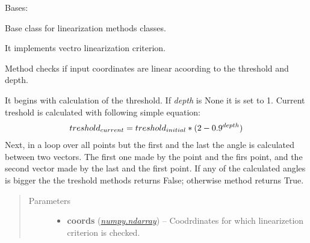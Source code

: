\documentclass[a4paper,10pt,english]{sphinxmanual}
\begin{document}
\begin{fulllineitems}
\label{aqueduct.geom.traces:aqueduct.geom.traces.VectorLinearize}
Bases: \href{http://docs.python.org/2/library/functions.html\#object}{}

Base class for linearization methods classes.

It implements vectro linearization criterion.

\begin{fulllineitems}
\label{aqueduct.geom.traces:aqueduct.geom.traces.VectorLinearize.__init__}
\end{fulllineitems}


\begin{fulllineitems}
\label{aqueduct.geom.traces:aqueduct.geom.traces.VectorLinearize.is_linear_core}
Method checks if input coordinates are linear acoording to the threshold and depth.

It begins with calculation of the threshold. If \emph{depth} is None it is set to 1. Current treshold is calculated with following simple equation:
\begin{gather}
\begin{split}treshold_{current} = treshold_{initial} * (2 - 0.9^{depth})\end{split}\notag
\end{gather}
Next, in a loop over all points but the first and the last the angle is calculated between two vectors. The first one made by the point and the firs point, and the second vector made by the last and the first point. If any of the calculated angles is bigger the the treshold methods returns False; otherwise method returns True.
\begin{quote}\begin{description}
\item[{Parameters}] \leavevmode\begin{itemize}
\item {} 
\textbf{coords} (\href{http://docs.scipy.org/doc/numpy/reference/generated/numpy.ndarray.html\#numpy.ndarray}{\emph{numpy.ndarray}}) -- Coodrdinates for which linearizetion criterion is checked.


\end{itemize}
\end{description}
\end{quote}
\end{fulllineitems}
\end{fulllineitems}
\end{document}
